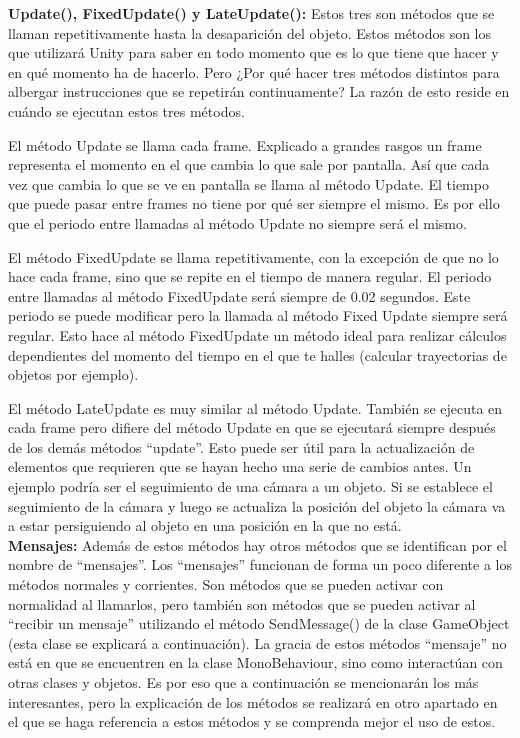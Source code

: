 \textbf{Update(), FixedUpdate() y LateUpdate():} Estos tres son métodos que se llaman repetitivamente hasta la desaparición del objeto. Estos métodos son los que utilizará Unity para saber en todo momento que es lo que tiene que hacer y en qué momento ha de hacerlo. Pero ¿Por qué hacer tres métodos distintos para albergar instrucciones que se repetirán continuamente? La razón de esto reside en cuándo se ejecutan estos tres métodos.

El método Update se llama cada frame. Explicado a grandes rasgos un frame representa el momento en el que cambia lo que sale por pantalla. Así que cada vez que cambia lo que se ve en pantalla se llama al método Update. El tiempo que puede pasar entre frames no tiene por qué ser siempre el mismo. Es por ello que el periodo entre llamadas al método Update no siempre será el mismo.

El método FixedUpdate se llama repetitivamente, con la excepción de que no lo hace cada frame, sino que se repite en el tiempo de manera regular. El periodo entre llamadas al método FixedUpdate será siempre de 0.02 segundos. Este periodo se puede modificar pero la llamada al método Fixed Update siempre será regular. Esto hace al método FixedUpdate un método ideal para realizar cálculos dependientes del momento del tiempo en el que te halles (calcular trayectorias de objetos por ejemplo).

El método LateUpdate es muy similar al método Update. También se ejecuta en cada frame pero difiere del método Update en que se ejecutará siempre después de los demás métodos “update”. Esto puede ser útil para la actualización de elementos que requieren que se hayan hecho una serie de cambios antes. Un ejemplo podría ser el seguimiento de una cámara a un objeto. Si se establece el seguimiento de la cámara y luego se actualiza la posición del objeto la cámara va a estar persiguiendo al objeto en una posición en la que no está.\\


\textbf{Mensajes:} Además de estos métodos hay otros métodos que se identifican por el nombre de “mensajes”. Los “mensajes” funcionan de forma un poco diferente a los métodos normales y corrientes. Son métodos que se pueden activar con normalidad al llamarlos, pero también son métodos que se pueden activar al “recibir un mensaje” utilizando el método SendMessage() de la clase GameObject (esta clase se explicará a continuación). La gracia de estos métodos “mensaje” no está en que se encuentren en la clase MonoBehaviour, sino como interactúan con otras clases y objetos. Es por eso que a continuación se mencionarán los más interesantes, pero la explicación de los métodos se realizará en otro apartado en el que se haga referencia a estos métodos y se comprenda mejor el uso de estos.

